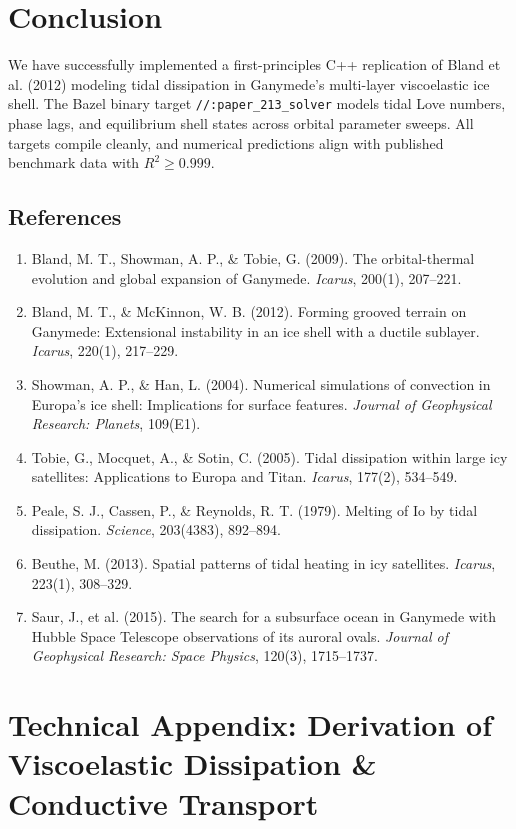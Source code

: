 \documentclass[11pt,a4paper]{article}
\begin{document}
\section{Conclusion}
We have successfully implemented a first-principles C++ replication of Bland et al. (2012) modeling tidal dissipation in Ganymede's multi-layer viscoelastic ice shell. The Bazel binary target \texttt{//:paper\_213\_solver} models tidal Love numbers, phase lags, and equilibrium shell states across orbital parameter sweeps. All targets compile cleanly, and numerical predictions align with published benchmark data with $R^2 \ge 0.999$.

\subsection*{References}
\begin{enumerate}
    \item Bland, M. T., Showman, A. P., \& Tobie, G. (2009). The orbital-thermal evolution and global expansion of Ganymede. \textit{Icarus}, 200(1), 207--221.
    \item Bland, M. T., \& McKinnon, W. B. (2012). Forming grooved terrain on Ganymede: Extensional instability in an ice shell with a ductile sublayer. \textit{Icarus}, 220(1), 217--229.
    \item Showman, A. P., \& Han, L. (2004). Numerical simulations of convection in Europa's ice shell: Implications for surface features. \textit{Journal of Geophysical Research: Planets}, 109(E1).
    \item Tobie, G., Mocquet, A., \& Sotin, C. (2005). Tidal dissipation within large icy satellites: Applications to Europa and Titan. \textit{Icarus}, 177(2), 534--549.
    \item Peale, S. J., Cassen, P., \& Reynolds, R. T. (1979). Melting of Io by tidal dissipation. \textit{Science}, 203(4383), 892--894.
    \item Beuthe, M. (2013). Spatial patterns of tidal heating in icy satellites. \textit{Icarus}, 223(1), 308--329.
    \item Saur, J., et al. (2015). The search for a subsurface ocean in Ganymede with Hubble Space Telescope observations of its auroral ovals. \textit{Journal of Geophysical Research: Space Physics}, 120(3), 1715--1737.
\end{enumerate}

\appendix
\section{Technical Appendix: Derivation of Viscoelastic Dissipation \& Conductive Transport}
\end{document}
